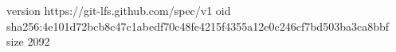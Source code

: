 version https://git-lfs.github.com/spec/v1
oid sha256:4e101d72bcb8c47c1abedf70c48fe4215f4355a12e0c246cf7bd503ba3ca8bbf
size 2092
